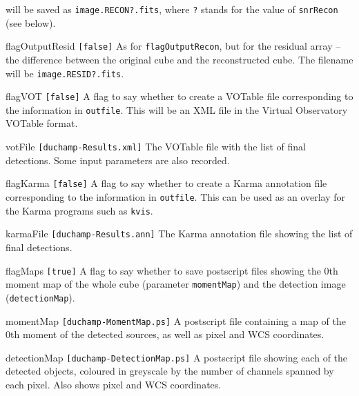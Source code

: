 \documentclass[12pt,a4paper]{article}
\newcommand{\entrylabel}[1]{\mbox{\textsf{\bf{#1:}}}\hfil}
\newenvironment{entry}
        {\begin{list}{}%
                {\renewcommand{\makelabel}{\entrylabel}%
                        \setlength{\labelwidth}{30mm}%
                        \setlength{\labelsep}{5pt}%
                        \setlength{\itemsep}{2pt}%
                        \setlength{\parsep}{2pt}%
                        \setlength{\leftmargin}{35mm}%
                }%
        }%
{\end{list}}
\begin{document}
\begin{entry}
  will be saved as \texttt{image.RECON?.fits}, where \texttt{?} stands for
  the value of \texttt{snrRecon} (see below).
\item[flagOutputResid \texttt{[false]}] As for \texttt{flagOutputRecon}, but
  for the residual array -- the difference between the original cube
  and the reconstructed cube. The filename will be \texttt{image.RESID?.fits}.
\item[flagVOT \texttt{[false]}] A flag to say whether to create a VOTable
  file corresponding to the information in \texttt{outfile}. This will be
  an XML file in the Virtual Observatory VOTable format.
\item[votFile \texttt{[duchamp-Results.xml]}] The VOTable file with the
  list of final detections. Some input parameters are also recorded.
\item[flagKarma \texttt{[false]}] A flag to say whether to create a
  Karma annotation file corresponding to the information in
  \texttt{outfile}. This can be used as an overlay for the Karma
  programs such as \texttt{kvis}.
\item[karmaFile \texttt{[duchamp-Results.ann]}] The Karma annotation
  file showing the list of final detections. 
\item[flagMaps \texttt{[true]}] A flag to say whether to save
  postscript files showing the 0th moment map of the whole cube
  (parameter \texttt{momentMap}) and the detection image
  (\texttt{detectionMap}).
\item[momentMap \texttt{[duchamp-MomentMap.ps]}] A postscript file
  containing a map of the 0th moment of the detected sources, as well
  as pixel and WCS coordinates.
\item[detectionMap \texttt{[duchamp-DetectionMap.ps]}] A postscript
  file showing each of the detected objects, coloured in greyscale by
  the number of channels spanned by each pixel. Also shows pixel and WCS
  coordinates.
\end{entry}
\end{document}
